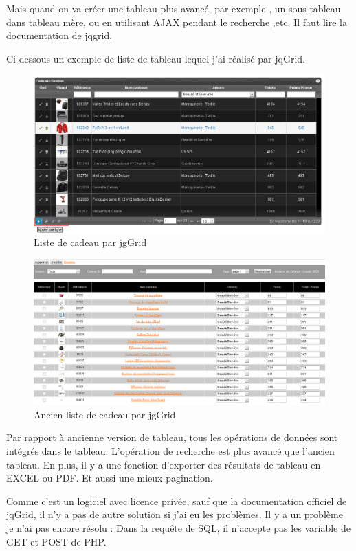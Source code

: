 Mais quand on va créer une tableau plus avancé, par exemple , un sous-tableau dans tableau mère, ou en utilisant AJAX pendant le recherche ,etc. Il faut lire la documentation de jqgrid.

Ci-dessous un exemple de liste de tableau lequel j'ai réalisé par jqGrid.
\begin{figure}[hbtp]
\includegraphics[width=16cm]{body/images/cadeau-new.png}
\caption{Liste de cadeau par jgGrid}
\end{figure}

\begin{figure}[hbtp]
\includegraphics[width=16cm]{body/images/cadeau-old.png}
\caption{Ancien liste de cadeau par jgGrid}
\end{figure}

Par rapport à ancienne version de tableau, tous les opérations de données sont intégrés dans le tableau. L'opération de recherche est plus avancé que l'ancien tableau. En plus, il y a une fonction d'exporter des résultats de tableau en EXCEL ou PDF. Et aussi une mieux pagination.

Comme c'est un logiciel avec licence privée, sauf que la documentation officiel de jqGrid, il n'y a pas de autre solution si j'ai eu les problèmes. Il y a un problème je n'ai pas encore résolu : 
Dans la requête de SQL, il n'accepte pas les variable de GET et POST de PHP. 

